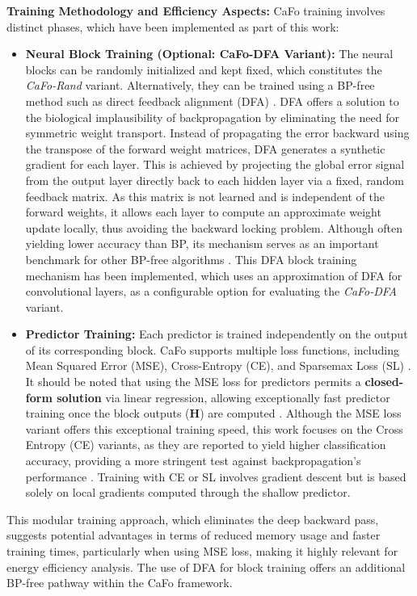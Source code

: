 \pagebreak %

\textbf{Training Methodology and Efficiency Aspects:}
CaFo training involves distinct phases, which have been implemented as part of this work:
\begin{itemize}
    \item \textbf{Neural Block Training (Optional: CaFo-DFA Variant):} The neural blocks can be randomly initialized and kept fixed, which constitutes the \textit{CaFo-Rand} variant. Alternatively, they can be trained using a BP-free method such as direct feedback alignment (DFA) \cite{nokland2016direct}. DFA offers a solution to the biological implausibility of backpropagation by eliminating the need for symmetric weight transport. Instead of propagating the error backward using the transpose of the forward weight matrices, DFA generates a synthetic gradient for each layer. This is achieved by projecting the global error signal from the output layer directly back to each hidden layer via a fixed, random feedback matrix. As this matrix is not learned and is independent of the forward weights, it allows each layer to compute an approximate weight update locally, thus avoiding the backward locking problem. Although often yielding lower accuracy than BP, its mechanism serves as an important benchmark for other BP-free algorithms \cite[Table 3]{gong2025mono}. This DFA block training mechanism has been implemented, which uses an approximation of DFA for convolutional layers, as a configurable option for evaluating the \textit{CaFo-DFA} variant.
    
    \item \textbf{Predictor Training:} Each predictor is trained independently on the output of its corresponding block. CaFo supports multiple loss functions, including Mean Squared Error (MSE), Cross-Entropy (CE), and Sparsemax Loss (SL) \cite{zhao2023cafo}. It should be noted that using the MSE loss for predictors permits a \textbf{closed-form solution} via linear regression, allowing exceptionally fast predictor training once the block outputs ($\mathbf{H}$) are computed \cite{zhao2023cafo}. Although the MSE loss variant offers this exceptional training speed, this work focuses on the Cross Entropy (CE) variants, as they are reported to yield higher classification accuracy, providing a more stringent test against backpropagation's performance \cite{zhao2023cafo}. Training with CE or SL involves gradient descent but is based solely on local gradients computed through the shallow predictor.
\end{itemize}
This modular training approach, which eliminates the deep backward pass, suggests potential advantages in terms of reduced memory usage and faster training times, particularly when using MSE loss, making it highly relevant for energy efficiency analysis. The use of DFA for block training offers an additional BP-free pathway within the CaFo framework.

